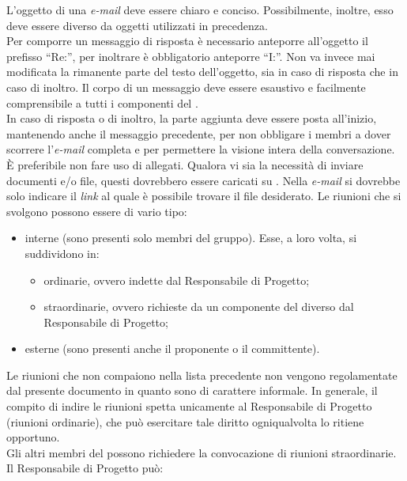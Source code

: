 					L’oggetto di una \textit{e-mail} deve essere chiaro e conciso. Possibilmente, inoltre, esso deve essere diverso da oggetti utilizzati in precedenza.\\
					Per comporre un messaggio di risposta è necessario anteporre all’oggetto il prefisso “Re:”, per inoltrare è obbligatorio anteporre “I:”. Non va invece mai modificata la rimanente parte del testo dell'oggetto, sia in caso di risposta che in caso di inoltro.
					Il corpo di un messaggio deve essere esaustivo e facilmente comprensibile a tutti i componenti del .\\
					In caso di risposta o di inoltro, la parte aggiunta deve essere posta all’inizio, mantenendo anche il messaggio precedente, per non obbligare i membri a dover scorrere l’\textit{e-mail} completa e per permettere la visione intera della conversazione.
					È preferibile non fare uso di allegati. Qualora vi sia la necessità di inviare documenti e/o file, questi dovrebbero essere caricati su . Nella \textit{e-mail} si dovrebbe solo indicare il \textit{link} al quale è possibile trovare il file desiderato.
				Le riunioni che si svolgono possono essere di vario tipo:
				\begin{itemize}
					\item interne (sono presenti solo membri del gruppo). Esse, a loro volta, si suddividono in:
					\begin{itemize}
						\item ordinarie, ovvero indette dal Responsabile di Progetto;
						\item straordinarie, ovvero richieste da un componente del  diverso dal Responsabile di Progetto;
					\end{itemize}
					\item esterne (sono presenti anche il proponente o il committente).
				\end{itemize}
				Le riunioni che non compaiono nella lista precedente non vengono regolamentate dal presente documento in quanto sono di carattere informale.
					In generale, il compito di indire le riunioni spetta unicamente al Responsabile di Progetto (riunioni ordinarie), che può esercitare tale diritto ogniqualvolta lo ritiene opportuno.\\
					Gli altri membri del  possono richiedere la convocazione di riunioni straordinarie. Il Responsabile di Progetto può:
